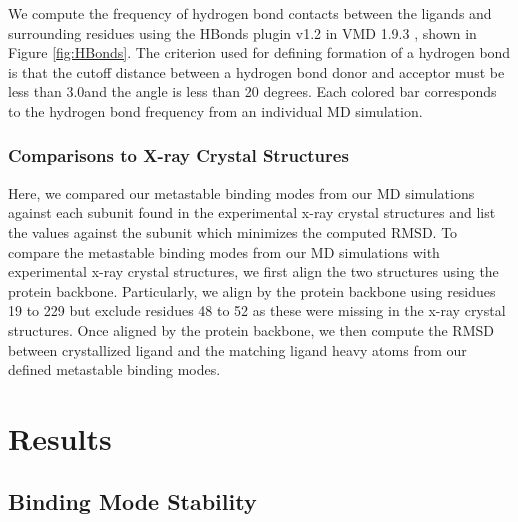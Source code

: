 \documentclass[fleqn,10pt]{wlscirep}
\newcommand{\angstrom}{\text{\normalfont\AA}}
\begin{document}
We compute the frequency of hydrogen bond contacts between the ligands and surrounding residues using the HBonds plugin v1.2 in VMD 1.9.3 \cite{humphrey1996vmd}, shown in Figure \ref{fig:HBonds}.
The criterion used for defining formation of a hydrogen bond is that the cutoff distance between a hydrogen bond donor and acceptor must be less than 3.0\angstrom and the angle is less than 20 degrees.
Each colored bar corresponds to the hydrogen bond frequency from an individual MD simulation.

\subsubsection{Comparisons to X-ray Crystal Structures}
Here, we compared our metastable binding modes from our MD simulations against each subunit found in the experimental x-ray crystal structures and list the values against the subunit which minimizes the computed RMSD.
To compare the metastable binding modes from our MD simulations with experimental x-ray crystal structures, we first align the two structures using the protein backbone.
Particularly, we align by the protein backbone using residues 19 to 229 but exclude residues 48 to 52 as these were missing in the x-ray crystal structures.
Once aligned by the protein backbone, we then compute the RMSD between crystallized ligand and the matching ligand heavy atoms from our defined metastable binding modes.

\section{Results}

\subsection{Binding Mode Stability}
\end{document}
